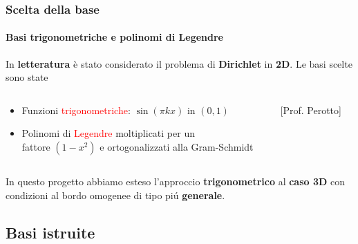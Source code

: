 \begin{frame}
 \frametitle{Scelta della base}
 \framesubtitle{Basi trigonometriche e polinomi di Legendre}
 In \textbf{letteratura} \`e stato considerato il problema di \textbf{Dirichlet} in \textbf{2D}.
 Le basi scelte sono state
 \begin{columns}
 \begin{column}{0.7\textwidth}
 \begin{itemize}
  \item Funzioni \textcolor{red}{trigonometriche}: $\sin(\pi k x)\text{ in }(0,1)$ 
  \item Polinomi di \textcolor{red}{Legendre} moltiplicati per un \\fattore $(1-x^2)$ e ortogonalizzati alla Gram-Schmidt 
 \end{itemize}
 \end{column}
 \begin{column}{0.3\textwidth}
 \footnotesize
  [Prof. Perotto]
  \vspace{0.45cm}
  
 \end{column}
 \end{columns}
\begin{alertblock}{In questo progetto}
 abbiamo esteso l'approccio \textbf{trigonometrico} al \textbf{caso 3D} con condizioni al bordo omogenee di tipo pi\'u \textbf{generale}.
\end{alertblock}

\end{frame}

 
\subsection{Basi istruite}

\begin{frame}
\tableofcontents[currentsection]
\end{frame}

